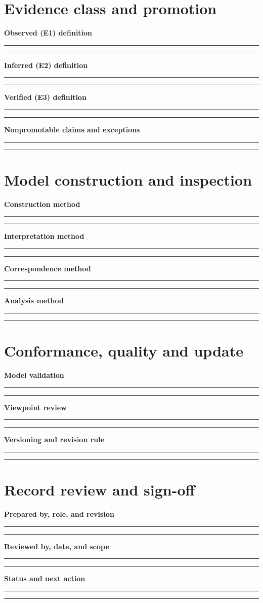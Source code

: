\documentclass[11pt,letterpaper]{article}
\newcommand{\Field}[2]{\par\noindent\textbf{#1}\par\vspace{1em}\noindent\rule{0.96\linewidth}{0.4pt}\par\vspace{1.0em}\noindent\rule{0.96\linewidth}{0.4pt}\par\vspace{1em}}
\begin{document}
\section{Evidence class and promotion}
\Field{Observed (E1) definition}{Require immutable GitHub configuration key or file-path evidence.}
\Field{Inferred (E2) definition}{Capture rule version, matched paths, ambiguity and uncertainty.}
\Field{Verified (E3) definition}{Require independently corroborating registry, deployment, service-catalog or approved owner records.}
\Field{Nonpromotable claims and exceptions}{Record uncertainty, failed lookups and negative results without silently upgrading confidence.}

\section{Model construction and inspection}
\Field{Construction method}{Specify reproducible revision pinning and parse rules.}
\Field{Interpretation method}{Explain evidence annotations, legends and prohibited inferences.}
\Field{Correspondence method}{Define how IDs and links reconcile across repository, job, component and deployment views.}
\Field{Analysis method}{Document consistency, coverage, missing data, impact analysis and drift detection.}

\section{Conformance, quality and update}
\Field{Model validation}{Define deterministic rebuild, schema validation and counterexamples.}
\Field{Viewpoint review}{Identify reviewer and acceptance criteria.}
\Field{Versioning and revision rule}{Track changes to model grammar, evidence semantics and status labels.}
\section{Record review and sign-off}
\Field{Prepared by, role, and revision}{Provide author, contact, version, and creation date.}
\Field{Reviewed by, date, and scope}{Record who reviewed which evidence and what remains open.}
\Field{Status and next action}{Distinguish unreviewed, draft, reviewed, approved, and superseded; attach approvals separately.}
\end{document}
